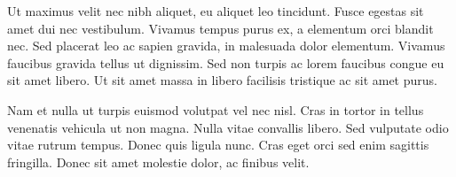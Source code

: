 \documentclass[runningheads,a4paper]{llncs}
\begin{document}
\begin{subappendices}
Ut maximus velit nec nibh aliquet, eu aliquet leo tincidunt. Fusce egestas sit amet dui nec vestibulum. Vivamus tempus purus ex, a elementum orci blandit nec. Sed placerat leo ac sapien gravida, in malesuada dolor elementum. Vivamus faucibus gravida tellus ut dignissim. Sed non turpis ac lorem faucibus congue eu sit amet libero. Ut sit amet massa in libero facilisis tristique ac sit amet purus.

Nam et nulla ut turpis euismod volutpat vel nec nisl. Cras in tortor in tellus venenatis vehicula ut non magna. Nulla vitae convallis libero. Sed vulputate odio vitae rutrum tempus. Donec quis ligula nunc. Cras eget orci sed enim sagittis fringilla. Donec sit amet molestie dolor, ac finibus velit.
%
\end{subappendices}
\end{document}
